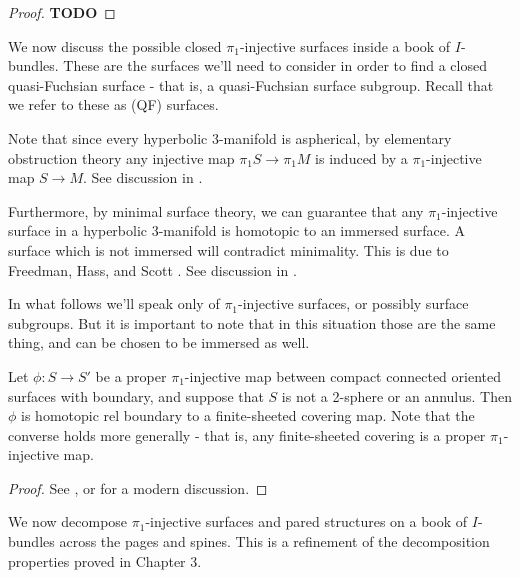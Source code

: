 \begin{proof}

\textbf{TODO}

\end{proof}

We now discuss the possible closed $\pi_1$-injective surfaces inside a book of
$I$-bundles. These are the surfaces we'll need to consider in order to find
a closed quasi-Fuchsian surface - that is, a quasi-Fuchsian surface subgroup.
Recall that we refer to these as (QF) surfaces.

Note that since every hyperbolic 3-manifold is aspherical, by elementary
obstruction theory any injective map $\pi_1S \to \pi_1M$ is induced by
a $\pi_1$-injective map $S \to M$. See discussion in \cite[Section 1.1]{LR}.

Furthermore, by minimal surface theory, we can guarantee that any
$\pi_1$-injective surface in a hyperbolic 3-manifold is homotopic to an
immersed surface.  A surface which is not immersed will contradict minimality.
This is due to Freedman, Hass, and Scott \cite{FreedmanHassScott}. See
discussion in \cite[Section 1]{Neu}.

In what follows we'll speak only of $\pi_1$-injective surfaces, or possibly
surface subgroups. But it is important to note that in this situation those are
the same thing, and can be chosen to be immersed as well.

\begin{lemma}\label{L:covering}

Let $\phi\colon S \to S'$ be a proper $\pi_1$-injective map between compact
connected oriented surfaces with boundary, and suppose that $S$ is not
a 2-sphere or an annulus.  Then $\phi$ is homotopic rel boundary to
a finite-sheeted covering map.  Note that the converse holds more generally
- that is, any finite-sheeted covering is a proper $\pi_1$-injective map.

\end{lemma}

\begin{proof}

See \cite{Nielsen}, or \cite{GabaiKazez} for a modern discussion.

\end{proof}

We now decompose $\pi_1$-injective surfaces and pared structures on a book of
$I$-bundles across the pages and spines. This is a refinement of the
decomposition properties proved in Chapter 3.

